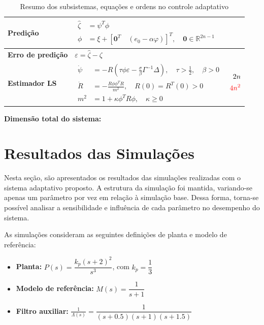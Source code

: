 \documentclass[10pt]{article}
\begin{document}
\begin{table}[htbp]
\begin{tabular}{|>{\bfseries}m{4cm}|m{7cm}|c|}
\hline
Predição & 
$\begin{aligned}
\hat{\zeta} &= \psi^T \phi \\
\phi &= \xi + \left[ \mathbf{0}^T \quad (e_0 - \alpha \varphi) \right]^T, \quad \mathbf{0} \in \mathbb{R}^{2n-1}
\end{aligned}$ & \\
\hline
Erro de predição & $\varepsilon = \hat{\zeta} - \zeta$ & \\
\hline
Estimador LS & 
$\begin{aligned}
\dot{\psi} &= -R \left( \tau \phi \varepsilon - \frac{\sigma}{\beta} \Gamma^{-1} \Delta \right), \quad \tau > \frac{1}{2}, \quad \beta > 0 \\
\dot{R} &= - \frac{R \phi \phi^T R}{m^2}, \quad R(0) = R^T(0) > 0 \\
m^2 &= 1 + \kappa \phi^T R \phi, \quad \kappa \geq 0
\end{aligned}$ & 
$\begin{aligned}
2n \\
\textcolor{red}{4n^2}
\end{aligned}$ \\
\hline
\end{tabular}
\caption{Resumo dos subsistemas, equações e ordens no controle adaptativo}
\label{tab:subsistemas}
\end{table}
\textbf{Dimensão total do sistema:} \quad
{}

\section{Resultados das Simulações}

Nesta seção, são apresentados os resultados das simulações realizadas com o sistema adaptativo proposto. A estrutura da simulação foi mantida, variando-se apenas um parâmetro por vez em relação à simulação base. Dessa forma, torna-se possível analisar a sensibilidade e influência de cada parâmetro no desempenho do sistema.

As simulações consideram as seguintes definições de planta e modelo de referência:

\begin{itemize}
    \item \textbf{Planta:} \( P(s) = \dfrac{k_p(s + 2)^2}{s^3} \), com \( k_p = \dfrac{1}{3} \)
    \item \textbf{Modelo de referência:} \( M(s) = \dfrac{1}{s + 1} \)
    \item \textbf{Filtro auxiliar:} \( \frac{1}{\Lambda(s)} = \dfrac{1}{(s + 0.5)(s + 1)(s + 1.5)} \)
\end{itemize}
\end{document}
